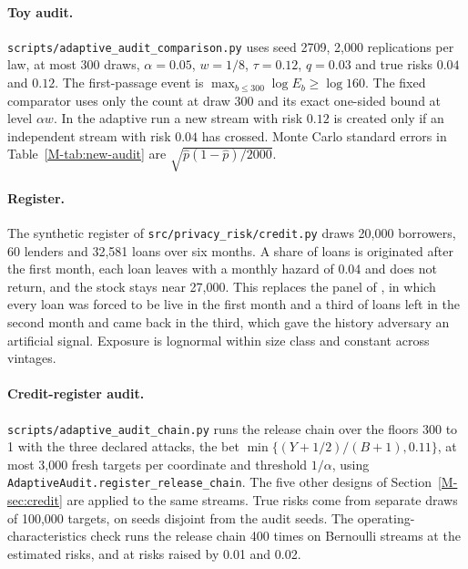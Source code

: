 \documentclass{jpc}
\begin{document}
\paragraph{Toy audit.} \nolinkurl{scripts/adaptive_audit_comparison.py} uses seed 2709, 2,000 replications per law, at most 300 draws, $\alpha=0.05$, $w=1/8$, $\tau=0.12$, $q=0.03$ and true risks $0.04$ and $0.12$. The first-passage event is $\max_{b\le300}\log E_b\ge\log160$. The fixed comparator uses only the count at draw 300 and its exact one-sided bound at level $\alpha w$. In the adaptive run a new stream with risk $0.12$ is created only if an independent stream with risk $0.04$ has crossed. Monte Carlo standard errors in Table~\ref{M-tab:new-audit} are $\sqrt{\hat p(1-\hat p)/2000}$.

\paragraph{Register.} The synthetic register of \nolinkurl{src/privacy_risk/credit.py} draws 20,000 borrowers, 60 lenders and 32,581 loans over six months. A share of loans is originated after the first month, each loan leaves with a monthly hazard of 0.04 and does not return, and the stock stays near 27,000. This replaces the panel of \cite{mahomane2026}, in which every loan was forced to be live in the first month and a third of loans left in the second month and came back in the third, which gave the history adversary an artificial signal. Exposure is lognormal within size class and constant across vintages.

\paragraph{Credit-register audit.} \nolinkurl{scripts/adaptive_audit_chain.py} runs the release chain over the floors 300 to 1 with the three declared attacks, the bet $\min\{(Y+1/2)/(B+1),0.11\}$, at most 3,000 fresh targets per coordinate and threshold $1/\alpha$, using \nolinkurl{AdaptiveAudit.register_release_chain}. The five other designs of Section~\ref{M-sec:credit} are applied to the same streams. True risks come from separate draws of 100,000 targets, on seeds disjoint from the audit seeds. The operating-characteristics check runs the release chain 400 times on Bernoulli streams at the estimated risks, and at risks raised by 0.01 and 0.02.
\end{document}
